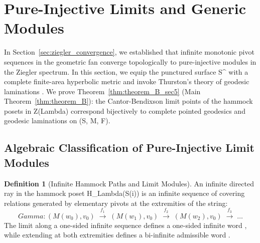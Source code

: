 \documentclass[11pt,a4paper,reqno]{amsart}
\def\({}%
\def\){}%
\def\mathcal#1{#1}%
\def\operatorname#1{#1}%
\def\forb{F}%
\def\Zg{Z}%
\def\Lambda{Lambda}%
\def\Gamma{Gamma}%
\def\emph#1{#1}%
\theoremstyle{definition}
\newtheorem{definition}[theorem]{Definition}
\theoremstyle{remark}
\newcommand{\Zg}{\operatorname{Zg}}
\newcommand{\forb}{\mathfrak{F}}
\begin{document}
\vspace{-0.2em}
\section{Pure-Injective Limits and Generic Modules}
\label{sec:laminations}

In Section~\ref{sec:ziegler_convergence}, we established that infinite monotonic pivot sequences in the geometric fan converge topologically to pure-injective modules in the Ziegler spectrum. In this section, we equip the punctured surface \(\mathcal{S}^\circ\) with a complete finite-area hyperbolic metric and invoke Thurston's theory of geodesic laminations \cite{Thurston1988, CassonBleiler1988}. We prove Theorem~\ref{thm:theorem_B_sec5} (Main Theorem~\ref{thm:theorem_B}): the Cantor-Bendixson limit points of the hammock posets in \(\Zg(\Lambda)\) correspond bijectively to complete pointed geodesics and geodesic laminations on \((\mathcal{S}, \mathcal{M}, \forb)\).

\subsection{Algebraic Classification of Pure-Injective Limit Modules}
\label{subsec:algebraic_limits}

\begin{definition}[Infinite Hammock Paths and Limit Modules]
\label{def:infinite_hammock_paths}
An \emph{infinite directed ray} in the hammock poset \(H_\Lambda(S(i))\) is an infinite sequence of covering relations generated by elementary pivots at the extremities of the string:
\[
\Gamma \colon (M(w_0), v_0) \;\xrightarrow{f_1}\; (M(w_1), v_0) \;\xrightarrow{f_2}\; (M(w_2), v_0) \;\xrightarrow{f_3}\; \dots
\]
The limit along a one-sided infinite sequence defines a one-sided infinite word \(\), while extending at both extremities defines a bi-infinite admissible word \(\).
\end{definition}
\end{document}
